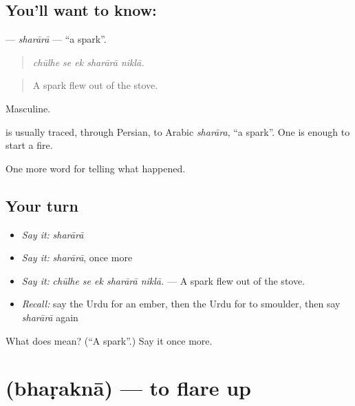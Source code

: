 \subsection*{You'll want to know: }
\textbf{} — \emph{sharārā} — \textquotedblleft{}a spark\textquotedblright{}.

\begin{quote}
    
\end{quote}

\begin{quote}
\emph{chūlhe se ek sharārā niklā.}
\end{quote}

\begin{quote}
A spark flew out of the stove.
\end{quote}

Masculine.

\begin{cousinweb}
is usually traced, through Persian, to Arabic \emph{sharāra}, \textquotedblleft{}a spark\textquotedblright{}. One \textbf{} is enough to start a fire.
\end{cousinweb}

\begin{grammarlens}[title={What you've built}]
One more word for telling what happened.
\end{grammarlens}

\subsection*{Your turn}
\begin{itemize}
\raggedright
  \item \emph{Say it:} \emph{sharārā}
  \item \emph{Say it:} \emph{sharārā}, once more
  \item \emph{Say it:} \emph{chūlhe se ek sharārā niklā.} — A spark flew out of the stove.
  \item \emph{Recall:} say the Urdu for an ember, then the Urdu for to smoulder, then say \emph{sharārā} again
\end{itemize}

\begin{tcolorbox}[breakable,colback=teal!4,colframe=teal!35!black,title={Before you move on}]
What does  mean? (\textquotedblleft{}A spark\textquotedblright{}.) Say it once more.
\end{tcolorbox}
\section[\texorpdfstring{\ur{بھڑکنا} (bhaṛaknā)}{بھڑکنا (bhaṛaknā)}]{ (bhaṛaknā) — to flare up}

